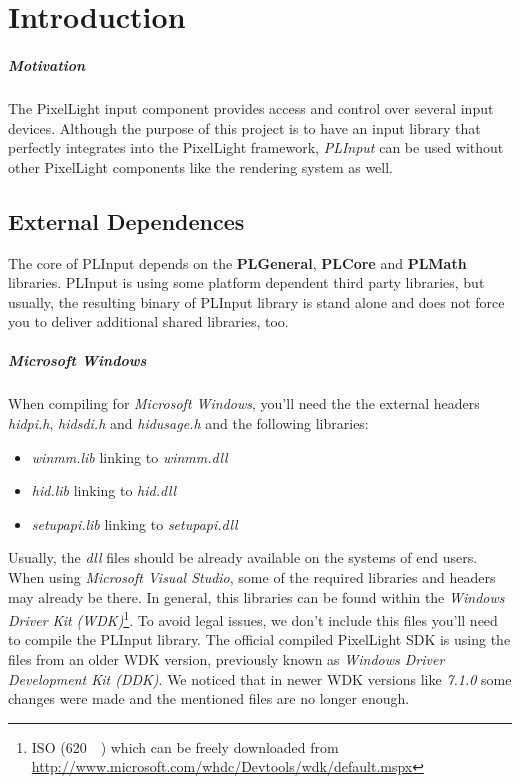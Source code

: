 \chapter{Introduction}


\paragraph{Motivation}
The PixelLight input component provides access and control over several input devices. Although the purpose of this project is to have an input library that perfectly integrates into the PixelLight framework, \emph{PLInput} can be used without other PixelLight components like the rendering system as well.




\section{External Dependences}
The core of PLInput depends on the \textbf{PLGeneral}, \textbf{PLCore} and \textbf{PLMath} libraries. PLInput is using some platform dependent third party libraries, but usually, the resulting binary of PLInput library is stand alone and does not force you to deliver additional shared libraries, too.


\paragraph{Microsoft Windows}
When compiling for \emph{Microsoft Windows}, you'll need the the external headers \emph{hidpi.h}, \emph{hidsdi.h} and \emph{hidusage.h} and the following libraries:
\begin{itemize}
\item \emph{winmm.lib} linking to \emph{winmm.dll}
\item \emph{hid.lib} linking to \emph{hid.dll}
\item \emph{setupapi.lib} linking to \emph{setupapi.dll}
\end{itemize}
Usually, the \emph{dll} files should be already available on the systems of end users. When using \emph{Microsoft Visual Studio}, some of the required libraries and headers may already be there. In general, this libraries can be found within the \emph{Windows Driver Kit (WDK)}\footnote{ISO (\SI{620}{\mebi\byte}) which can be freely downloaded from \url{http://www.microsoft.com/whdc/Devtools/wdk/default.mspx}}. To avoid legal issues, we don't include this files you'll need to compile the PLInput library. The official compiled PixelLight SDK is using the files from an older WDK version, previously known as \emph{Windows Driver Development Kit (DDK)}. We noticed that in newer WDK versions like \emph{7.1.0} some changes were made and the mentioned files are no longer enough.
